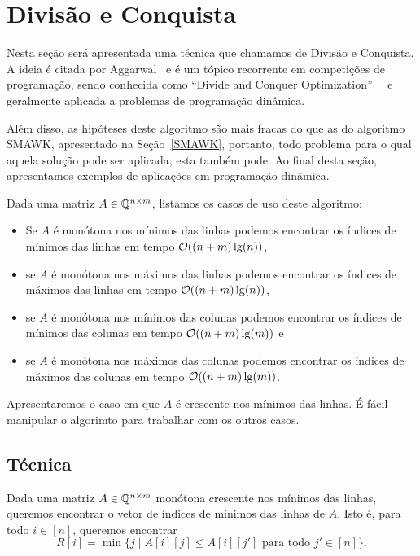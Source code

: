 \section{Divisão e Conquista}
\label{DivConq}


Nesta seção será apresentada uma técnica que chamamos de Divisão e Conquista. A ideia é citada por Aggarwal~\cite{Aggarwal:1987} e é um tópico recorrente em competições de programação, sendo conhecida como ``Divide and Conquer Optimization''~\cite{Quora:DivConq}~\cite{CF:Optm} e geralmente aplicada a problemas de programação dinâmica. 

Além disso, as hipóteses deste algoritmo são mais fracas do que as do algoritmo SMAWK, apresentado na Seção~\ref{SMAWK}, portanto, todo problema para o qual aquela solução pode ser aplicada, esta também pode. Ao final desta seção, apresentamos exemplos de aplicações em programação dinâmica.  

Dada uma matriz $A \in \mathbb{Q}^{n \times m}$, listamos os casos de uso deste algoritmo:
\begin{itemize}
    \item Se $A$ é monótona nos mínimos das linhas podemos encontrar os índices de mínimos das linhas em tempo $\mathcal{O}((n+m)\lg(n))$, 
    \item se $A$ é monótona nos máximos das linhas podemos encontrar os índices de máximos das linhas em tempo $\mathcal{O}((n+m)\lg(n))$, 
    \item se $A$ é monótona nos mínimos das colunas podemos encontrar os índices de mínimos das colunas em tempo $\mathcal{O}((n+m)\lg(m))$ e 
    \item se $A$ é monótona nos máximos das colunas podemos encontrar os índices de máximos das colunas em tempo $\mathcal{O}((n+m)\lg(m))$.
\end{itemize}

Apresentaremos o caso em que $A$ é crescente nos mínimos das linhas. É fácil manipular o algorimto para trabalhar com os outros casos.


\subsection{Técnica}
Dada uma matriz $A \in \mathbb{Q}^{n \times m}$ monótona crescente nos mínimos das linhas, queremos encontrar o vetor de índices de mínimos das linhas de $A$. Isto é, para todo $i \in [n]$, queremos encontrar
$$ R[i] = \min\{j \mid A[i][j] \leq A[i][j'] \text{ para todo } j' \in [n]\} \text{.}$$  

